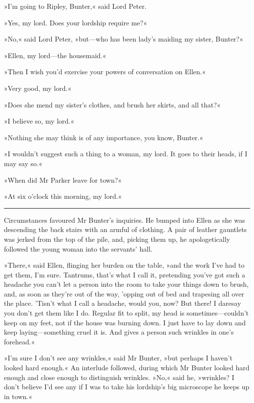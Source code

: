 »I'm going to Ripley, Bunter,« said Lord Peter.

»Yes, my lord. Does your lordship require me?«

»No,« said Lord Peter, »but—who has been lady's maiding my sister, Bunter?«

»Ellen, my lord—the housemaid.«

»Then I wish you'd exercise your powers of conversation on Ellen.«

»Very good, my lord.«

»Does she mend my sister's clothes, and brush her skirts, and all that?«

»I believe so, my lord.«

»Nothing she may think is of any importance, you know, Bunter.«

»I wouldn't suggest such a thing to a woman, my lord. It goes to their heads, if I may say so.«

»When did Mr Parker leave for town?«

»At six o'clock this morning, my lord.«

\noindent\hfil\rule{0.5\textwidth}{.4pt}\hfil

Circumstances favoured Mr Bunter's inquiries. He bumped into Ellen as she was descending the back stairs with an armful of clothing. A pair of leather gauntlets was jerked from the top of the pile, and, picking them up, he apologetically followed the young woman into the servants' hall.

»There,« said Ellen, flinging her burden on the table, »and the work I've had to get them, I'm sure. Tantrums, that's what I call it, pretending you've got such a headache you can't let a person into the room to take your things down to brush, and, as soon as they're out of the way, 'opping out of bed and trapesing all over the place.  'Tisn't what I call a headache, would you, now? But there! I daresay you don't get them like I do. Regular fit to split, my head is sometimes—couldn't keep on my feet, not if the house was burning down.  I just have to lay down and keep laying—something cruel it is. And gives a person such wrinkles in one's forehead.«

»I'm sure I don't see any wrinkles,« said Mr Bunter, »but perhaps I haven't looked hard enough.« An interlude followed, during which Mr  Bunter looked hard enough and close enough to distinguish wrinkles.  »No,« said he, »wrinkles? I don't believe I'd see any if I was to take his lordship's big microscope he keeps up in town.«

